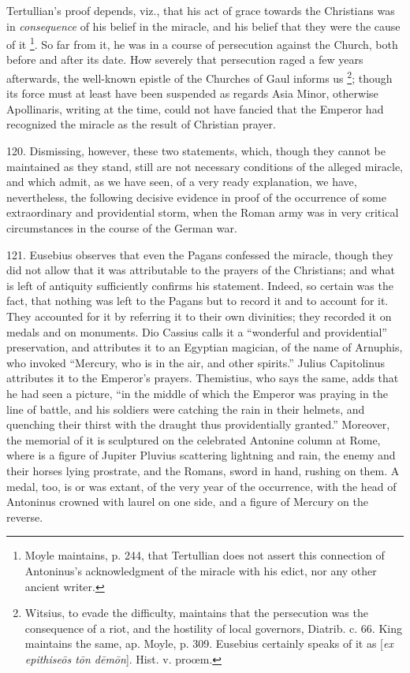 Tertullian's proof depends, viz., that his act of grace towards the
Christians was in \emph{consequence} of his belief in the miracle, and
his belief that they were the cause of it \footnote{Moyle maintains, p. 244, that Tertullian does not assert this
connection of Antoninus's acknowledgment of the miracle with his
edict, nor any other ancient writer.}. So far from it, he was in a course of persecution against the
Church, both before and after its date. How severely that persecution
raged a few years afterwards, the well-known epistle of the Churches
of Gaul informs us \footnote{Witsius, to evade the difficulty, maintains that the persecution was
the consequence of a riot, and the hostility of local governors,
Diatrib. c. 66. King maintains the same, ap. Moyle, p. 309. Eusebius
certainly speaks of it as [\emph{ex epithise\={o}s t\={o}n d\={e}m\={o}n}].
Hist. v. proœm.};
though its force must at least have been suspended as regards Asia
Minor, otherwise Apollinaris, writing at the time, could not have fancied that the Emperor had recognized the miracle as the result
of Christian prayer.

120.
Dismissing, however, these two statements, which, though they cannot
be maintained as they stand, still are not necessary conditions of the
alleged miracle, and which admit, as we have seen, of a very ready
explanation, we have, nevertheless, the following decisive evidence in
proof of the occurrence of some extraordinary and providential storm,
when the Roman army was in very critical circumstances in the course
of the German war.

121.
Eusebius observes that even the Pagans confessed the miracle, though
they did not allow that it was attributable to the prayers of the
Christians; and what is left of antiquity sufficiently confirms his
statement. Indeed, so certain was the fact, that nothing was left to
the Pagans but to record it and to account for it. They accounted for
it by referring it to their own divinities; they recorded it on medals
and on monuments. Dio Cassius calls it a ``wonderful and providential''
preservation, and attributes it to an Egyptian magician, of the name
of Arnuphis, who invoked ``Mercury, who is in the air, and other
spirits.'' Julius Capitolinus attributes it to the Emperor's
prayers. Themistius, who says the same, adds that he had seen a
picture, ``in the middle of which the Emperor was praying in the line
of battle, and his soldiers were catching the rain in their helmets,
and quenching their thirst with the draught thus providentially
granted.'' Moreover, the memorial of it is sculptured on the celebrated
Antonine column at Rome, where is a figure of Jupiter Pluvius
scattering lightning and rain, the enemy and their horses lying
prostrate, and the Romans, sword in hand, rushing on them. A medal,
too, is or was extant, of the very year of the occurrence, with the
head of Antoninus crowned with laurel on one side, and a figure of
Mercury on the reverse.

